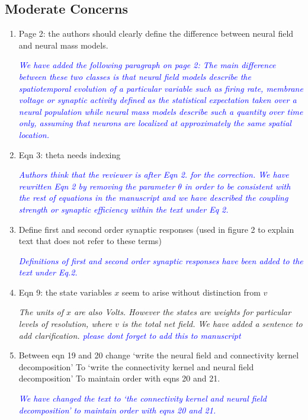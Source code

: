 \documentclass{article}
\newcommand{\parham}[1]{\textcolor{blue}{#1}}
\begin{document}
			\subsection{Moderate Concerns} 
			\begin{enumerate} 
			 \item Page 2: the authors should clearly define the difference between neural field and neural mass models.
			
			\emph{\parham{We have added the following paragraph on page 2: The main difference between these two classes is that neural field models describe the spatiotemporal evolution of a particular variable such as firing rate, membrane voltage or synaptic activity defined as the statistical expectation taken over a neural population while neural mass models describe such a quantity over time only, assuming that neurons are localized at approximately the same spatial location.}}
			
			\item Eqn 3: theta needs indexing 
 
			\emph{\parham{Authors think that the reviewer is after Eqn 2. for the correction.  We have rewritten Eqn 2 by removing the parameter $\theta$ in order to be consistent with the rest of equations in the manuscript and we have described the coupling strength or synaptic efficiency within the text under Eq 2.}}
 			
			\item Define first and second order synaptic responses (used in figure 2 to explain text that does not refer to these terms)
			
			\emph{\parham{Definitions of first and second order synaptic responses have been added to the text under Eq.2.}}
			
			\item{Eqn 9: the state variables $x$ seem to arise without distinction from $v$}  
			
			\emph{The units of $x$ are also Volts. However the states are weights for particular levels of resolution, where $v$ is the total net field. We have added a sentence to add clarification. \parham{please dont forget to add this to manuscript}}
			
			\item Between eqn 19 and 20 change
			`write the neural field and connectivity kernel decomposition' To `write the connectivity kernel and neural field decomposition'
			To maintain order with eqns 20 and 21.

			\emph{\parham{We have changed the text to `the connectivity kernel and neural field decomposition' to maintain order with eqns 20 and 21.}}
			
			 
			 \end{enumerate}  
\end{document}
